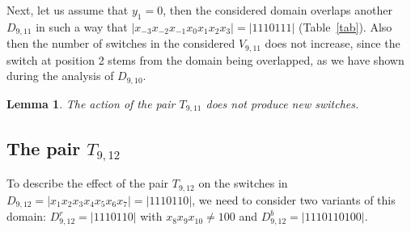 \documentclass{sn-jnl}
\newtheorem{lem}{Lemma}%
\begin{document}
Next, let us assume that $y_1=0$, then the considered domain overlaps another $D_{9,11}$ in such a way that $|x_{-3}x_{-2}x_{-1}x_{0}x_{1}x_{2}x_{3}|=|1110111|$ (Table~\ref{tab}).
Also then the number of switches in the considered $V_{9,11}$ does not increase, since the switch at position 2 stems from the domain being overlapped, as we have shown during the analysis of $D_{9,10}$. 

\begin{lem}\label{lem:t9t11}
The action of the pair $T_{9,11}$ does not produce new switches. 
\end{lem}


\subsection{The pair $T_{9,12}$}

To describe the effect of the pair $T_{9,12}$ on the switches in $D_{9,12}=|x_1x_{2}x_{3}x_{4}x_{5}x_{6}x_{7}|$$=|1110110|$, we need to consider two variants of this domain:  $D_{9,12}^r=|1110110|$ with $x_{8}x_{9}x_{10}\neq 100$ and $D_{9,12}^b=|1110110100|$. 
\end{document}
